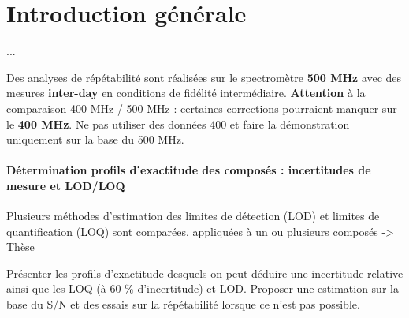 \chapter*{Introduction générale}

...

Des analyses de répétabilité sont réalisées sur le spectromètre \textbf{500 MHz} avec des mesures \textbf{inter-day} en conditions de fidélité intermédiaire.
\textbf{Attention} à la comparaison 400 MHz / 500 MHz : certaines corrections pourraient manquer sur le \textbf{400 MHz}. Ne pas utiliser des données 400 et faire la démonstration uniquement sur la base du 500 MHz.

\subsubsection{Détermination profils d'exactitude des composés : incertitudes de mesure et LOD/LOQ}
Plusieurs méthodes d'estimation des limites de détection (LOD) et limites de quantification (LOQ) sont comparées, appliquées à un ou plusieurs composés -> Thèse

Présenter les profils d'exactitude desquels on peut déduire une incertitude relative ainsi que les LOQ (à 60 \% d'incertitude) et LOD. Proposer une estimation sur la base du S/N et des essais sur la répétabilité lorsque ce n'est pas possible.